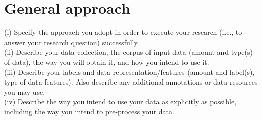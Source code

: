 \documentclass[11pt, a4paper]{article}
\begin{document}
\section{General approach}
(i) Specify the approach you adopt in order to execute your research (i.e., to answer your research question) successfully.\\
(ii) Describe your data collection, the corpus of input data (amount and type(s) of data), the way you will obtain it, and how you intend to use it.\\
(iii) Describe your labels and data representation/features (amount and label(s), type of data features). Also describe any additional annotations or data resources you may use.\\
(iv) Describe the way you intend to use your data as explicitly as possible, including the way you intend to pre-process your data.
\end{document}
